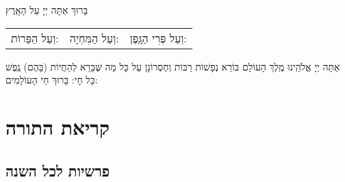 \documentclass[twoside, openany, parskip=half, 11pt]{book}
\begin{document}
בָּרוּךְ אַתָּה יְיָ עַל הָאָֽרֶץ 

\begin{tabular}{c|c|c}
וְעַל הַפֵּרוֹת: & וְעַל הַמִּחְיָה: & וְעַל פְּרִי הַגָּֽפֶן:
\end{tabular}

\sepline

  אַתָּה יְיָ אֱלֹהֵֽינוּ מֶֽלֶךְ הָעוֹלָם בּוֹרֵא נְפָשׁוֹת רַבּוֹת וְחֶסְרוֹנָן 
עַל כָּל מַה שֶּׁבָּרָא לְהַחֲיוֹת (בָּהֶם) נֶֽפֶשׁ כָּל חָי: בָּרוּךְ חַי הָעוֹלָמִים:

\chapter[קריאת התורה]{ קריאת התורה }
\label{torah}

\section{פרשיות לכל השנה}
\end{document}
